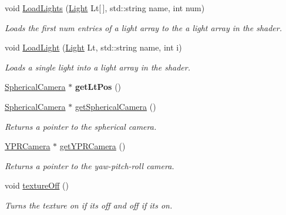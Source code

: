 \begin{DoxyCompactItemize}
void \hyperlink{class_graphics_engine_a269f114b7d1b964401074213e5145f47}{Load\+Lights} (\hyperlink{class_light}{Light} Lt\mbox{[}$\,$\mbox{]}, std\+::string name, int num)
\begin{DoxyCompactList}\small\item\em Loads the first num entries of a light array to the a light array in the shader. \end{DoxyCompactList}\item 
void \hyperlink{class_graphics_engine_ab58f167e0bd7aa6cfd59ad31b01ac4fd}{Load\+Light} (\hyperlink{class_light}{Light} Lt, std\+::string name, int i)
\begin{DoxyCompactList}\small\item\em Loads a single light into a light array in the shader. \end{DoxyCompactList}\item 
\mbox{\label{class_graphics_engine_ad7ed9774587ef174dde420779153d7a0}} 
\hyperlink{class_spherical_camera}{Spherical\+Camera} $\ast$ {\bfseries get\+Lt\+Pos} ()
\item 
\mbox{\label{class_graphics_engine_a08fa5ea5485b0bab2d902dd71ac995d9}} 
\hyperlink{class_spherical_camera}{Spherical\+Camera} $\ast$ \hyperlink{class_graphics_engine_a08fa5ea5485b0bab2d902dd71ac995d9}{get\+Spherical\+Camera} ()
\begin{DoxyCompactList}\small\item\em Returns a pointer to the spherical camera. \end{DoxyCompactList}\item 
\mbox{\label{class_graphics_engine_a99c1b6f36ce3c8e02cba2a97b08eab05}} 
\hyperlink{class_y_p_r_camera}{Y\+P\+R\+Camera} $\ast$ \hyperlink{class_graphics_engine_a99c1b6f36ce3c8e02cba2a97b08eab05}{get\+Y\+P\+R\+Camera} ()
\begin{DoxyCompactList}\small\item\em Returns a pointer to the yaw-\/pitch-\/roll camera. \end{DoxyCompactList}\item 
\mbox{\label{class_graphics_engine_ac8cb20a22155745d4478c39b2111bc48}} 
void \hyperlink{class_graphics_engine_ac8cb20a22155745d4478c39b2111bc48}{texture\+Off} ()
\begin{DoxyCompactList}\small\item\em Turns the texture on if it\textquotesingle{}s off and off if it\textquotesingle{}s on. \end{DoxyCompactList}\item 

\end{DoxyCompactItemize}
